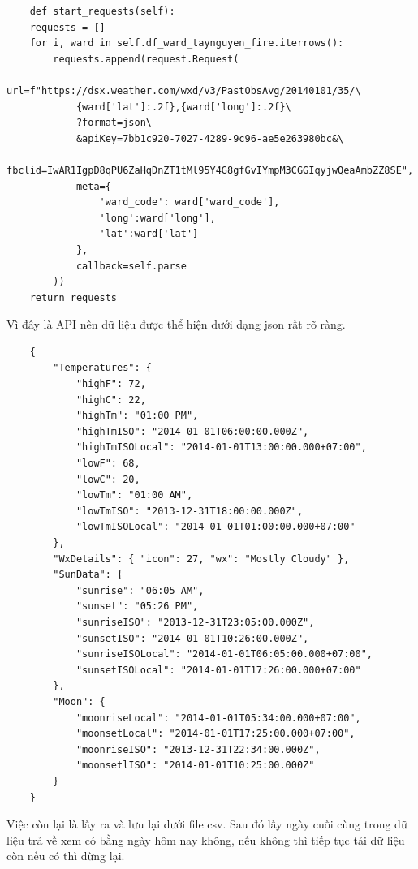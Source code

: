 \documentclass{article}
\begin{document}
\begin{verbatim}
	def start_requests(self):
	requests = []
	for i, ward in self.df_ward_taynguyen_fire.iterrows():
		requests.append(request.Request(
			url=f"https://dsx.weather.com/wxd/v3/PastObsAvg/20140101/35/\
			{ward['lat']:.2f},{ward['long']:.2f}\
			?format=json\
			&apiKey=7bb1c920-7027-4289-9c96-ae5e263980bc&\
			fbclid=IwAR1IgpD8qPU6ZaHqDnZT1tMl95Y4G8gfGvIYmpM3CGGIqyjwQeaAmbZZ8SE",
			meta={
				'ward_code': ward['ward_code'],
				'long':ward['long'],
				'lat':ward['lat']
			},
			callback=self.parse
		))
	return requests
\end{verbatim}

Vì đây là API nên dữ liệu được thể hiện dưới dạng json rất rõ ràng.

\begin{verbatim}
	{
        "Temperatures": {
            "highF": 72,
            "highC": 22,
            "highTm": "01:00 PM",
            "highTmISO": "2014-01-01T06:00:00.000Z",
            "highTmISOLocal": "2014-01-01T13:00:00.000+07:00",
            "lowF": 68,
            "lowC": 20,
            "lowTm": "01:00 AM",
            "lowTmISO": "2013-12-31T18:00:00.000Z",
            "lowTmISOLocal": "2014-01-01T01:00:00.000+07:00"
        },
        "WxDetails": { "icon": 27, "wx": "Mostly Cloudy" },
        "SunData": {
            "sunrise": "06:05 AM",
            "sunset": "05:26 PM",
            "sunriseISO": "2013-12-31T23:05:00.000Z",
            "sunsetISO": "2014-01-01T10:26:00.000Z",
            "sunriseISOLocal": "2014-01-01T06:05:00.000+07:00",
            "sunsetISOLocal": "2014-01-01T17:26:00.000+07:00"
        },
        "Moon": {
            "moonriseLocal": "2014-01-01T05:34:00.000+07:00",
            "moonsetLocal": "2014-01-01T17:25:00.000+07:00",
            "moonriseISO": "2013-12-31T22:34:00.000Z",
            "moonsetlISO": "2014-01-01T10:25:00.000Z"
        }
    }
\end{verbatim}

Việc còn lại là lấy ra và lưu lại dưới file csv. Sau đó lấy ngày cuối cùng trong dữ liệu trả về xem có bằng ngày hôm nay không, nếu không thì tiếp tục tải dữ liệu còn nếu có thì dừng lại.
\end{document}
